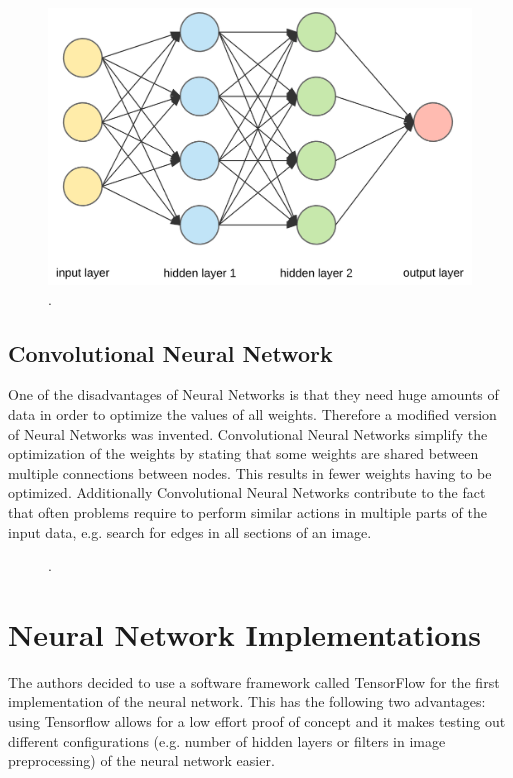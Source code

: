 \begin{figure}[h!]
	\centering
	\includegraphics[width=4.5in]{img/methodology_neuralNetwork_visualizationOfANN.png}
	\caption{.}
	\label{pic:methodology_neuralNetwork_visualizationOfANN}
\end{figure}

\subsection{Convolutional Neural Network}
One of the disadvantages of Neural Networks is that they need huge amounts of data in order to optimize the values of all weights. Therefore a modified version of Neural Networks was invented. Convolutional Neural Networks simplify the optimization of the weights by stating that some weights are shared between multiple connections between nodes. This results in fewer weights having to be optimized. Additionally Convolutional Neural Networks contribute to the fact that often problems require to perform similar actions in multiple parts of the input data, e.g. search for edges in all sections of an image.

\begin{figure}[h!]
	\centering
	\caption{.}
	\label{pic:methodology_neuralNetwork_visualizationOfACNN}
\end{figure}

\section{Neural Network Implementations}
The authors decided to use a software framework called TensorFlow for the first implementation of the neural network. This has the following two advantages: using Tensorflow allows for a low effort proof of concept and it makes testing out different configurations (e.g. number of hidden layers or filters in image preprocessing) of the neural network easier.


